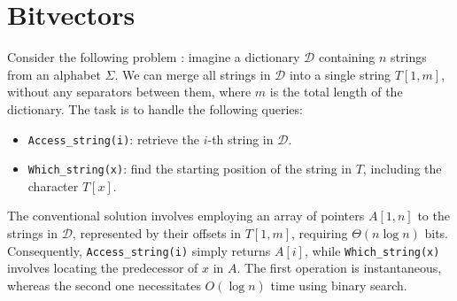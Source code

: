 \section{Bitvectors} \label{sec:bitvectors}
Consider the following problem \cite{ferragina2023pearls}: imagine a dictionary $\mathcal{D}$ containing $n$ strings from an alphabet $\Sigma$. We can merge all strings in $\mathcal{D}$ into a single string $T[1,m]$, without any separators between them, where $m$ is the total length of the dictionary. The task is to handle the following queries:
    \begin{itemize}
    \item \texttt{Access\_string(i)}: retrieve the $i$-th string in $\mathcal{D}$.
    \item \texttt{Which\_string(x)}: find the starting position of the string in $T$, including the character $T[x]$.
\end{itemize}
The conventional solution involves employing an array of pointers $A[1, n]$ to the strings in $\mathcal{D}$, represented by their offsets in $T[1, m]$, requiring $\Theta(n \log n)$ bits. Consequently, \texttt{Access\_string(i)} simply returns $A[i]$, while \texttt{Which\_string(x)} involves locating the predecessor of $x$ in $A$. The first operation is instantaneous, whereas the second one necessitates $O(\log n)$ time using binary search. \vspace{0.4cm}

